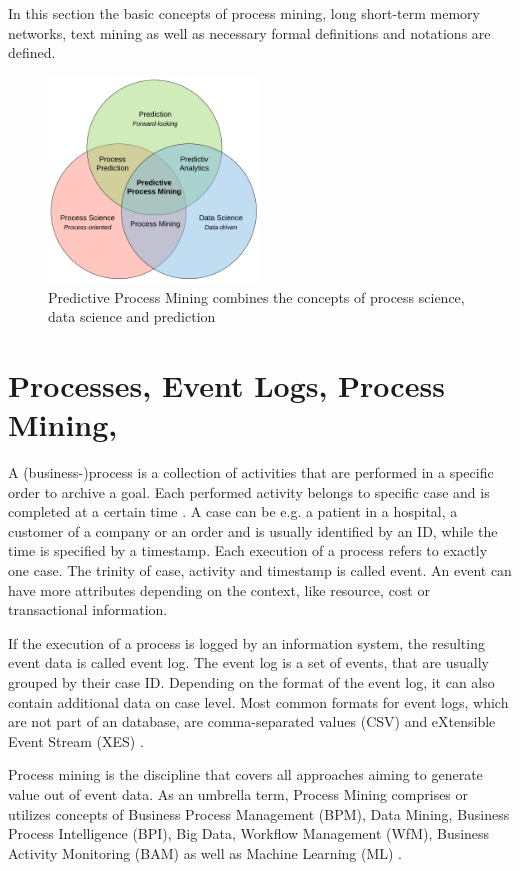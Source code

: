 In this section the basic concepts of process mining, long short-term memory networks, text mining as well as necessary formal definitions and notations are defined.


\begin{figure}
	\centering
	\includegraphics[width=0.5\textwidth]{figures/predictive-process-mining}
	\caption{Predictive Process Mining combines the concepts of process science, data science and prediction}
\end{figure}


\section{Processes, Event Logs, Process Mining, }

A (business-)process is a collection of activities that are performed in a specific order to archive a goal.
Each performed activity belongs to specific case and is completed at a certain time \cite{DBLP:conf/bpm/AalstAM11}.
A case can be e.g. a patient in a hospital, a customer of a company or an order and is usually identified by an ID, while 
the time is specified by a timestamp.
Each execution of a process refers to exactly one case.
The trinity of case, activity and timestamp is called event.
An event can have more attributes depending on the context, like resource, cost or transactional information.

If the execution of a process is logged by an information system, the resulting event data is called event log.
The event log is a set of events, that are usually grouped by their case ID. Depending on the format of the event log, it can also contain additional data on case level.
Most common formats for event logs, which are not part of an database, are comma-separated values (CSV) and eXtensible Event Stream (XES) \cite{DBLP:conf/caise/VerbeekBDA10a}.

Process mining is the discipline that covers all approaches aiming to generate value out of event data.
As an umbrella term, Process Mining comprises or utilizes concepts of Business Process Management (BPM), Data Mining, Business Process Intelligence (BPI), Big Data, Workflow Management (WfM), Business Activity Monitoring (BAM) \cite{DBLP:books/sp/Aalst16} as well as Machine Learning (ML) \cite{DBLP:conf/bpm/VeitGMHT17}.

